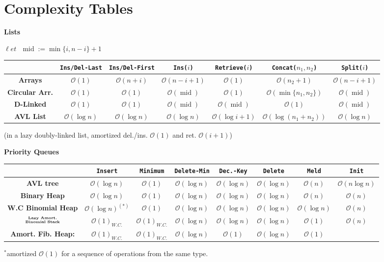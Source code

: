 \documentclass[]{article}
\newcommand\compactsection   [1]        {\vspace{-10pt}\section{#1}\vspace{-5pt}}
\newcommand\oc    {\mathcal{O}}
\newcommand\set   {\ell et \text{ }}
\newcommand\logn      {\log n}
\theoremstyle{definition}
\newcommand\regFont   {\fontsize{6}{7}\rmfamily}
\newcommand\tableFont {\fontsize{5}{4}\rmfamily}
\DeclareMathOperator{\midText}{mid}
\begin{document}
	\vspace{-13pt}
	\compactsection{Complexity Tables}
	\vspace{-15pt}
	\begin{multicols}{2}
		{\regFont\hfil \textbf{Lists}}\tableFont
		
		{\hfil $\set \midText := \min\{i, n - i\} + 1$}
		\begin{center}
			\begin{tabular}{c|c|c|c|c|c|c} %
				& \texttt{Ins/Del-Last} & \texttt{Ins/Del-First} & \texttt{Ins($i$)} & \texttt{Retrieve($i$)} &
				\texttt{Concat($n_1, n_2$)} & \texttt{Split($i$)} \\
				\hline
				\textbf{Arrays} & $\oc(1)$ & $\oc(n + i)$ & $\oc(n - i + 1)$ & $\oc(1)$  & $\oc(n_2 + 1)$ & $\oc(n - i + 1)$ \\
				\textbf{Circular Arr.} & $\oc(1)$ & $\oc(1)$ & $\oc(\midText)$ & $\oc(1)$ & $\oc(\min\{n_1, n_2\})$ & $\oc(\midText)$ \\ 
				\textbf{D-Linked} & $\oc(1)$ & $\oc(1)$ & $\oc(\midText)$ & $\oc(\midText)$ & $\oc(1)$ & $\oc(\midText)$ \\ 
				\textbf{AVL List} & $\oc(\logn)$ & $\oc(\logn)$ & $\oc(\logn)$ &$\oc(\log i + 1)$ & $\oc(\log(n_1 + n_2))$ & $\oc(\logn)$
			\end{tabular}
		\end{center}
		(in a lazy doubly-linked list, amortized del./ins. $\oc(1)$ and ret. $\oc(i + 1)$)
		
		
		
		\columnbreak
		
		{\regFont\hfil \textbf{Priority Queues}}\tableFont 
		\begin{center}\begin{tabular}{c|c|c|c|c|c|c|c}
				& \textbf{\texttt{Insert}} & \textbf{\texttt{Minimum}} & \textbf{\texttt{Delete-Min}} & \textbf{\texttt{Dec.-Key}} & \textbf{\texttt{Delete}} & \textbf{\texttt{Meld}} & \textbf{\texttt{Init}} \\
				\hline
				\textbf{AVL tree} & $\oc(\logn) $ & $\oc(1)$ & $\oc(\logn)$ & $\oc(\logn)$ & $\oc(\logn)$ & $\oc(n)$ & $\oc(n \logn)$ \\
				\textbf{Binary Heap} & $\oc(\logn)$ & $\oc(1)$ & $\oc(\logn)$ & $\oc(\logn)$ & $\oc(\logn)$ & $\oc(n)$ & $\oc(n)$ \\
				\textbf{W.C Binomial Heap} & $\oc(\logn)^{(*)}$ & $\oc(1)$ & $\oc(\logn)$ & $\oc(\logn)$ & $\oc(\logn)$ & $\oc(\logn)$ & $\oc(n)$ \\
				$\overset{\text{\tableFont \textbf{Lazy Amort.}}}{\text{\tableFont \textbf{Binomial Stack}}}$
				& $\oc(1)_{W.C.}$ & $ \oc(1)_{W.C.} $ & $\oc(\logn)$ & $\oc(\logn)$ & $\oc(\logn)$ & $\oc(1)$ & $\oc(n)$ \\
				\textbf{Amort. Fib. Heap: }& $\oc(1)_{W.C.}$ & $ \oc(1)_{W.C.} $ & $\oc(\logn)$ & $\oc(1)$ & $\oc(\logn)$ & $\oc(1)$ & \\
			\end{tabular}\end{center}
			$^{*}$amortized $\oc(1)$ for a sequence of operations from the same type. 
	\end{multicols}
	
	
\end{document}
